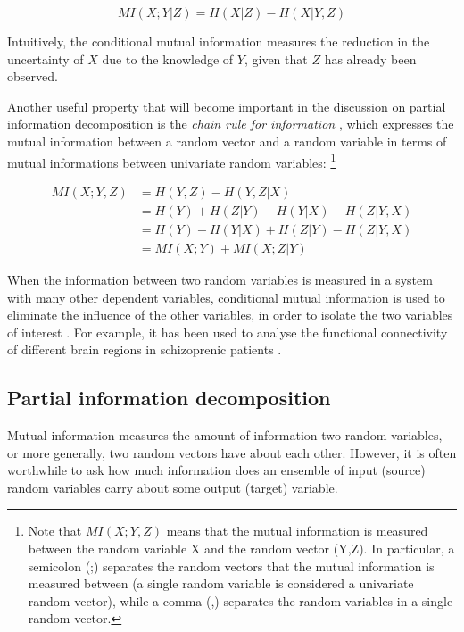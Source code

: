 \documentclass[12pt]{article}
\begin{document}
\begin{equation}
MI(X;Y|Z) = H(X|Z) - H(X|Y,Z)
\end{equation}

Intuitively, the conditional mutual information measures the reduction in the uncertainty of $X$ due to the knowledge of $Y$, given that $Z$ has already been observed. 

Another useful property that will become important in the discussion on partial information decomposition is the \textit{chain rule for information} \cite{cover-thomas}, which expresses the mutual information between a random vector and a random variable in terms of mutual informations between univariate random variables: \footnote{Note that $MI(X;Y,Z)$ means that the mutual information is measured between the random variable X and the random vector (Y,Z). In particular, a semicolon (;) separates the random vectors that the mutual information is measured between (a single random variable is considered a univariate random vector), while a comma (,) separates the random variables in a single random vector.}

\begin{equation}
\begin{split}
MI(X;Y,Z) & = H(Y,Z) - H(Y,Z|X) \\ 
		  & = H(Y) + H(Z|Y) - H(Y|X) - H(Z|Y,X) \\ 
		  & = H(Y) - H(Y|X) + H(Z|Y) - H(Z|Y,X) \\ 
		  & = MI(X;Y) + MI(X;Z|Y)
\label{eq:chain-rule-inf}
\end{split}
\end{equation}

When the information between two random variables is measured in a system with many other dependent variables, conditional mutual information is used to eliminate the influence of the other variables, in order to isolate the two variables of interest \cite{williams-beer}. For example, it has been used to analyse the functional connectivity of different brain regions in schizoprenic patients \cite{brain-cond-inf}.

\newpage
\subsection{Partial information decomposition}

Mutual information measures the amount of information two random variables, or more generally, two random vectors have about each other. However, it is often worthwhile to ask how much information does an ensemble of input (source) random variables carry about some output (target) variable. 
\end{document}
